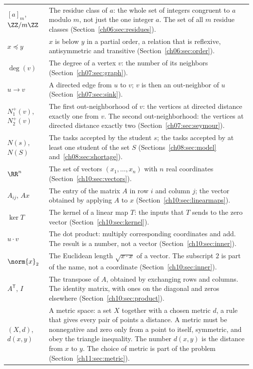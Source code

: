 \begin{longtable}{@{}p{1.25in}p{3.95in}@{}}
$[a]_m$, $\ZZ/m\ZZ$ & The residue class of $a$: the whole set of integers congruent to $a$ modulo $m$, not just the one integer $a$. The set of all $m$ residue classes (Section~\ref{ch06:sec:residues}).\\
$x\preceq y$ & $x$ is below $y$ in a partial order, a relation that is reflexive, antisymmetric and transitive (Section~\ref{ch06:sec:order}).\\
$\deg(v)$ & The degree of a vertex $v$: the number of its neighbors (Section~\ref{ch07:sec:graph}).\\
$u\to v$ & A directed edge from $u$ to $v$; $v$ is then an out-neighbor of $u$ (Section~\ref{ch07:sec:sink}).\\
$N_1^+(v)$, $N_2^+(v)$ & The first out-neighborhood of $v$: the vertices at directed distance exactly one from $v$. The second out-neighborhood: the vertices at directed distance exactly two (Section~\ref{ch07:sec:seymour}).\\
$N(s)$, $N(S)$ & The tasks accepted by the student $s$; the tasks accepted by at least one student of the set $S$ (Sections~\ref{ch08:sec:model} and~\ref{ch08:sec:shortage}).\\
$\RR^n$ & The set of vectors $(x_1,\ldots,x_n)$ with $n$ real coordinates (Section~\ref{ch10:sec:vectors}).\\
$A_{ij}$, $Ax$ & The entry of the matrix $A$ in row $i$ and column $j$; the vector obtained by applying $A$ to $x$ (Section~\ref{ch10:sec:linearmaps}).\\
$\ker T$ & The kernel of a linear map $T$: the inputs that $T$ sends to the zero vector (Section~\ref{ch10:sec:kernel}).\\
$u\cdot v$ & The dot product: multiply corresponding coordinates and add. The result is a number, not a vector (Section~\ref{ch10:sec:inner}).\\
$\norm{x}_2$ & The Euclidean length $\sqrt{x\cdot x}$ of a vector. The subscript $2$ is part of the name, not a coordinate (Section~\ref{ch10:sec:inner}).\\
$A^{\mathsf T}$, $I$ & The transpose of $A$, obtained by exchanging rows and columns. The identity matrix, with ones on the diagonal and zeros elsewhere (Section~\ref{ch10:sec:product}).\\
$(X,d)$, $d(x,y)$ & A metric space: a set $X$ together with a chosen metric $d$, a rule that gives every pair of points a distance. A metric must be nonnegative and zero only from a point to itself, symmetric, and obey the triangle inequality. The number $d(x,y)$ is the distance from $x$ to $y$. The choice of metric is part of the problem (Section~\ref{ch11:sec:metric}).\\

\end{longtable}
